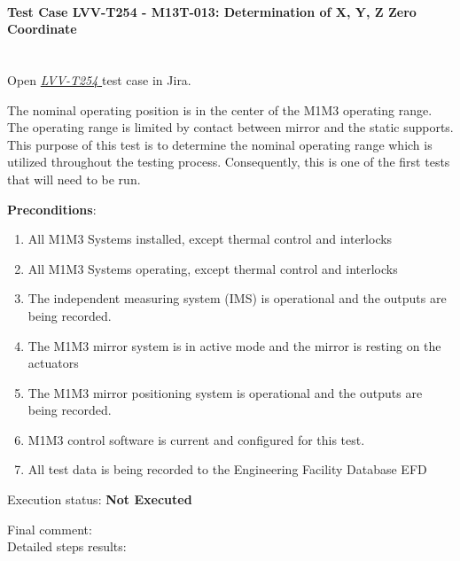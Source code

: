 \documentclass[SE,lsstdraft,STR,toc]{lsstdoc}
\providecommand{\tightlist}{
  \setlength{\itemsep}{0pt}\setlength{\parskip}{0pt}}
\begin{document}
\paragraph{Test Case LVV-T254 - M13T-013: Determination of X, Y, Z Zero Coordinate }\mbox{}\\

Open  \href{https://jira.lsstcorp.org/secure/Tests.jspa#/testCase/LVV-T254}{\textit{ LVV-T254 } }
test case in Jira.

The nominal operating position is in the center of the M1M3 operating
range. The operating range is limited by contact between mirror and the
static supports. This purpose of this test is to determine the nominal
operating range which is utilized throughout the testing process.
Consequently, this is one of the first tests that will need to be run.~

\textbf{ Preconditions}:\\
\begin{enumerate}
\tightlist
\item
  All M1M3 Systems installed, except thermal control and interlocks
\item
  All M1M3 Systems operating, except thermal control and interlocks
\item
  The independent measuring system (IMS) is operational and the outputs
  are being recorded.
\item
  The M1M3 mirror system is in active mode and the mirror is resting on
  the actuators
\item
  The M1M3 mirror positioning system is operational and the outputs are
  being recorded.
\item
  M1M3 control software is current and configured for this test.
\item
  All test data is being recorded to the Engineering Facility Database
  EFD
\end{enumerate}

Execution status: {\bf Not Executed }

Final comment:\\


Detailed steps results:
\end{document}
